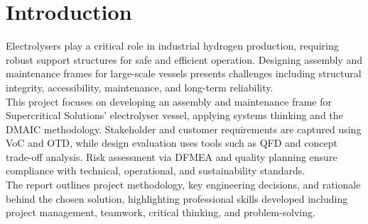 \documentclass[9pt]{extarticle}
\begin{document}
\section{Introduction}
Electrolysers play a critical role in industrial hydrogen production, requiring {robust support structures} for safe and efficient operation. Designing assembly and maintenance frames for large-scale vessels presents challenges including structural integrity, accessibility, maintenance, and long-term reliability.\\[0.8em]
This project focuses on developing an assembly and maintenance frame for Supercritical Solutions’ electrolyser vessel, applying {systems thinking} and the {DMAIC methodology}. Stakeholder and customer requirements are captured using {VoC} and {OTD}, while design evaluation uses tools such as {QFD} and concept trade-off analysis. Risk assessment via {DFMEA} and quality planning ensure compliance with technical, operational, and sustainability standards.\\[0.8em]
The report outlines project methodology, key engineering decisions, and rationale behind the chosen solution, highlighting professional skills developed including {project management}, {teamwork}, {critical thinking}, and {problem-solving}.

\end{document}
